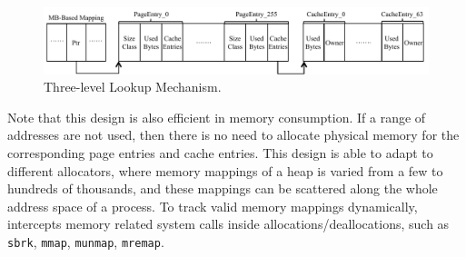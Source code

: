 \begin{figure}[!ht]
\centering
\includegraphics[width=5.5in]{figures/lookup2}
\caption{Three-level Lookup Mechanism.\label{fig:lookup}}
\end{figure}

Note that this design is also efficient in memory consumption. If a range of addresses are not used, then there is no need to allocate physical memory for the corresponding page entries and cache entries. This design is able to adapt to different allocators, where memory mappings of a heap is varied from a few to hundreds of thousands, and these mappings can be scattered along the whole address space of a process. To track valid memory mappings dynamically, \MP{} intercepts memory related system calls inside allocations/deallocations, such as \texttt{sbrk}, \texttt{mmap}, \texttt{munmap}, \texttt{mremap}. 